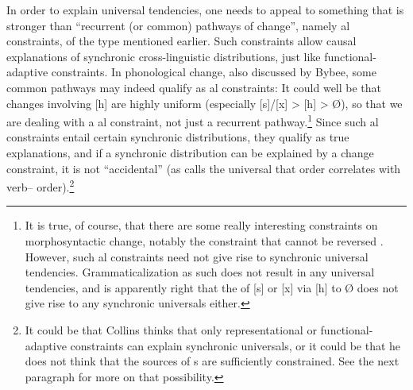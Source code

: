 \documentclass[output=paper]{langsci/langscibook}
\begin{document}
In order to explain universal tendencies, one needs to appeal to something that is stronger than “recurrent (or common) pathways of change”, namely al constraints, of the type mentioned earlier. Such constraints allow causal explanations of synchronic cross-linguistic distributions, just like functional-adaptive constraints. In phonological change, also discussed by Bybee, some common pathways may indeed qualify as al constraints: It could well be that changes involving [h] are highly uniform (especially [s]/[x] > [h] > Ø), so that we are dealing with a al constraint, not just a recurrent pathway.\footnote{It is true, of course, that there are some really interesting constraints on morphosyntactic change, notably the constraint that  cannot be reversed \citep{Haspelmath1999_Irrev}. However, such al constraints need not give rise to synchronic universal tendencies. Grammaticalization as such does not result in any universal tendencies, and \citet[§8]{Bybee2006_Univ} is apparently right that the  of [s] or [x] via [h] to Ø does not give rise to any synchronic universals either.} Since such al constraints entail certain synchronic distributions, they qualify as true explanations, and if a synchronic distribution can be explained by a change constraint, it is not “accidental” (as  calls the universal that  order correlates with verb– order).\footnote{It could be that Collins thinks that only representational or functional-adaptive constraints can explain synchronic universals, or it could be that he does not think that the sources of s are sufficiently constrained. See the next paragraph for more on that possibility.}
 
\end{document}
